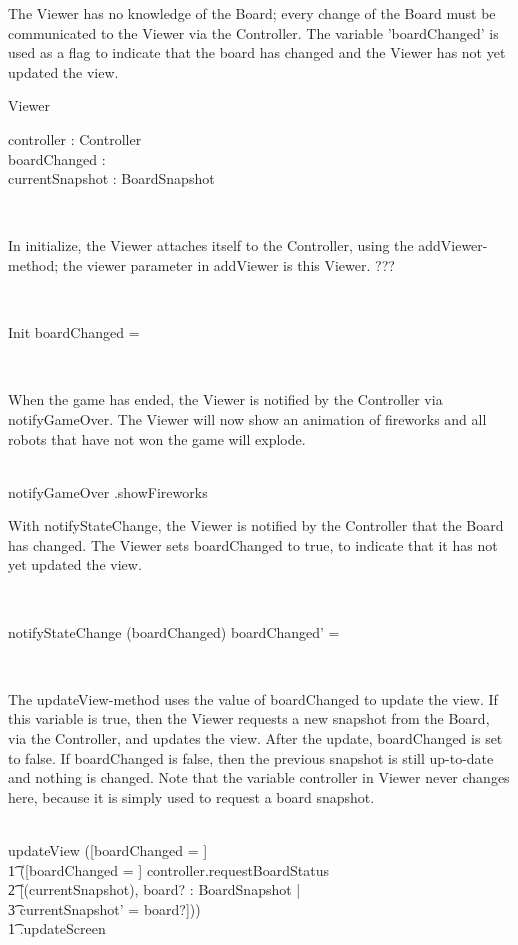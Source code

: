 \documentclass[12pt]{article}
\begin{document}
The Viewer has no knowledge of the Board; every change of the Board must be communicated to the Viewer via the Controller. The variable 'boardChanged' is used as a flag to indicate that the board has changed and the Viewer has not yet updated the view.
\begin{class}{Viewer}
\begin{state}
controller : Controller \\
boardChanged : \bool \\
currentSnapshot : BoardSnapshot \\
\end{state}\\
\begin{zpar}
In initialize, the Viewer attaches itself to the Controller, using the addViewer-method; the viewer parameter in addViewer is this Viewer. ???
\end{zpar} \\
\begin{schema}{Init}
boardChanged = \false
\end{schema}\\
\begin{zpar}
When the game has ended, the Viewer is notified by the Controller via notifyGameOver. The Viewer will now show an animation of fireworks and all robots that have not won the game will explode.
\end{zpar} \\
notifyGameOver \sdef {}.showFireworks \\
\begin{zpar}
With notifyStateChange, the Viewer is notified by the Controller that the Board has changed. The Viewer sets boardChanged to true, to indicate that it has not yet updated the view.
\end{zpar} \\
\begin{schema}{notifyStateChange}
\Delta (boardChanged)
\where
boardChanged' = \true
\end{schema}\\
\znewpage
\begin{zpar}
The updateView-method uses the value of boardChanged to update the view. If this variable is true, then the Viewer requests a new snapshot from the Board, via the Controller, and updates the view. After the update, boardChanged is set to false. If boardChanged is false, then the previous snapshot is still up-to-date and nothing is changed. Note that the variable controller in Viewer never changes here, because it is simply used to request a board snapshot.
\end{zpar} \\
updateView \sdef ([boardChanged = \false] \;\; [] \\ \t1
([boardChanged = \true] \wedge controller.requestBoardStatus \;\; \comp \\ \t2 [\Delta(currentSnapshot), board? : BoardSnapshot | \\ \t3 currentSnapshot' = board?])) \; \; \comp \\ \t1 .updateScreen
\end{class}
\end{document}
